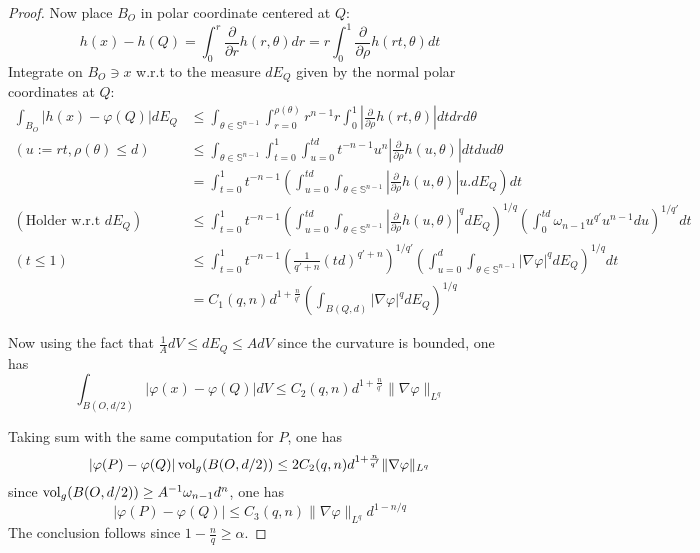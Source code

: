 \documentclass[11pt]{article}
\begin{document}
\begin{proof}
Now place \(B_O\) in polar coordinate centered at \(Q\):
\[
 h(x) - h(Q) = \int_0^r \frac{\partial}{\partial r}h(r,\theta) dr = r\int_0^1
\frac{\partial}{\partial \rho}h(rt,\theta) dt
\]
Integrate on \(B_O\ni x\) w.r.t to the measure \(dE_Q\) given by the normal polar
coordinates at \(Q\):
\begin{equation}
\label{eq:lem:sobolev-case-holder}
\begin{split}
\int_{B_O} |h(x) - \varphi(Q)| dE_Q &\leq \int_{\theta\in \mathbb{S}^{n-1}} \int_{r=0}^{\rho(\theta)} r^{n-1}r \int_0^1|\frac{\partial}{\partial \rho}h(rt,\theta)|dtdrd\theta \\
( u:= rt, \rho(\theta)\leq d)\qquad &\leq \int_{\theta\in \mathbb{S}^{n-1}}\int_{t=0}^1\int_{u=0}^{td}t^{-n-1}u^n \left|\frac{\partial}{\partial \rho}h(u,\theta)\right|dtdud\theta\\
      	  		   &= \int_{t=0}^1 t^{-n-1}\left( \int_{u=0}^{td}\int_{\theta\in \mathbb{S}^{n-1}}\left| \frac{\partial}{\partial \rho}h(u,\theta) \right|u. dE_Q  \right)dt \\
(\text{Holder w.r.t } dE_Q)\qquad &\leq \int_{t=0}^1  t^{-n-1} \left( \int_{u=0}^{td} \int_{\theta\in \mathbb{S}^{n-1}} \left| \frac{\partial}{\partial \rho}h(u,\theta) \right|^q dE_Q \right)^{1/q} \left( \int_0^{td}\omega_{n-1} u^{q'}u^{n-1} du \right)^{1/q'}dt\\
(t\leq 1)\qquad	      &\leq\int_{t=0}^{1} t^{-n-1} \left(\frac{1}{q'+n}(td)^{q'+n}\right)^{1/q'} \left( \int_{u=0}^d\int_{\theta\in \mathbb{S}^{n-1}} |\nabla\varphi|^q dE_Q   \right)^{1/q}dt\\
       &= C_1(q,n)d^{1 + \frac{n}{q'}} \left(\int_{B(Q,d)}|\nabla\varphi|^q dE_Q   \right)^{1/q}
\end{split}   
\end{equation}

Now using the fact that \(\frac{1}{A} dV \leq dE_Q\leq A dV\) since the curvature is bounded, one
has
\[
 \int_{B(O,d/2)}|\varphi(x) -\varphi(Q)|dV \leq C_2(q,n)d^{1 + \frac{n}{q'}} \| \nabla\varphi\|_{L^q}
\]

Taking sum with the same computation for \(P\), one has
\[
\left| \varphi(P)-\varphi(Q)\right|\mathop{\rm vol}\nolimits_g(B(O,d/2)) \leq 2C_2(q,n) d^{1 + \frac{n}{q'}}  \| \nabla\varphi\|_{L^q}
\]
since \(\mathop{\rm vol}\nolimits_g(B(O,d/2)) \geq A^{-1}\omega_{n-1}d^n\), one has
\[
 \left| \varphi(P)-\varphi(Q)\right| \leq C_3(q,n) \|\nabla\varphi\|_{L^q} d^{1-n/q}
\]
The conclusion follows since \(1-\frac{n}{q}\geq \alpha\).
\end{proof}
\end{document}
